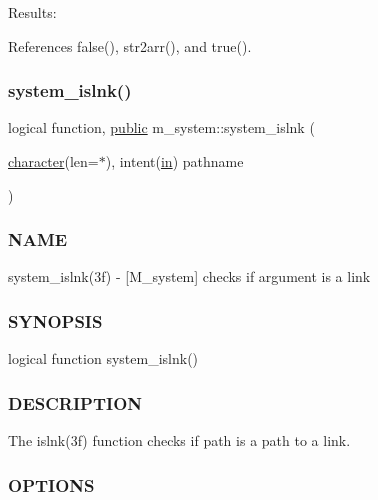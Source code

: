 Results\+: 

References false(), str2arr(), and true().

\mbox{\label{namespacem__system_ab05694cc3d76a3ecc87e4b4490c4c217}} 
\subsubsection{\texorpdfstring{system\+\_\+islnk()}{system\_islnk()}}
{\footnotesize\ttfamily logical function, \hyperlink{M__stopwatch_83_8txt_a2f74811300c361e53b430611a7d1769f}{public} m\+\_\+system\+::system\+\_\+islnk (\begin{DoxyParamCaption}\item[{\hyperlink{option__stopwatch_83_8txt_abd4b21fbbd175834027b5224bfe97e66}{character}(len=$\ast$), intent(\hyperlink{M__journal_83_8txt_afce72651d1eed785a2132bee863b2f38}{in})}]{pathname }\end{DoxyParamCaption})}



\subsubsection*{N\+A\+ME}

system\+\_\+islnk(3f) -\/ \mbox{[}M\+\_\+system\mbox{]} checks if argument is a link 

\subsubsection*{S\+Y\+N\+O\+P\+S\+IS}

\begin{DoxyVerb}logical function system_islnk()
\end{DoxyVerb}


\subsubsection*{D\+E\+S\+C\+R\+I\+P\+T\+I\+ON}

The islnk(3f) function checks if path is a path to a link.

\subsubsection*{O\+P\+T\+I\+O\+NS}

